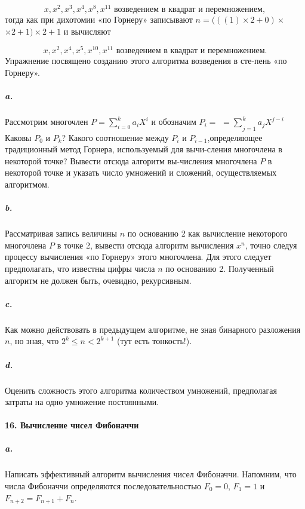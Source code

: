 \begin{equation*}
x, x^{2},x^{3},x^{4},x^{8},x^{11} \text{ возведением в квадрат и перемножением},
\end{equation*}
тогда как при дихотомии «по Горнеру» записывают $n= (\left({\left({1}\right)\times{2}+0}\right)\times$\linebreak
$\times{2}+1)\times{2}+1$ и вычисляют 

\begin{equation*}
x, x^{2},x^{4},x^{5},x^{10},x^{11} \text{ возведением в квадрат и перемножением}.
\end{equation*}
Упражнение посвящено созданию этого алгоритма возведения в сте-\linebreak пень «по Горнеру».


\subparagraph { a.} Рассмотрим многочлен $P=\sum_{i=0}^k a_{i}X^{i}$ и обозначим $ P_{i}=$\linebreak
$={\sum_{}^{}}_{j=1}^k a_{j}X^{j-i}$ Каковы $P_{0}$ и $P_{k}$? Какого соотношение между $P_{i}$ и $P_{i-1}$,\linebreak определяющее традиционный метод Горнера, используемый для вычи-\linebreak сления многочлена в некоторой точке? Вывести отсюда алгоритм вы-\linebreak числения многочлена $P$ в некоторой точке и указать число умножений и сложений, осуществляемых алгоритмом. 

\subparagraph { b.} Рассматривая запись величины $n$ по основанию 2 как вычисление некоторого многочлена $P$ в точке 2, вывести отсюда алгоритм вычисления $x^{n}$, точно следуя процессу вычисления «по Горнеру» этого многочлена. Для этого следует предполагать, что известны цифры числа $n$ по основанию 2. Полученный алгоритм не должен быть, очевидно, рекурсивным. 

\subparagraph { c.} Как можно действовать в предыдущем алгоритме, не зная бинарного разложения $n$, но зная, что $2^{k}\leq{n}<2^{k+1}$ (тут есть тонкость!).

\subparagraph { d.} Оценить сложность этого алгоритма количеством умножений, предполагая затраты на одно умножение постоянными. 

\paragraph { 16. Вычисление чисел Фибоначчи }

\subparagraph { a.} Написать эффективный алгоритм вычисления чисел Фибоначчи. Напомним, что числа Фибоначчи определяются последовательностью $F_{0}=0$, $F_{1}=1$ и $F_{n+2}=F_{n+1}+F_{n}$.

